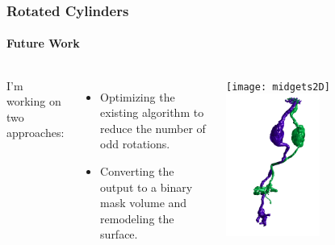 \documentclass[11pt]{beamer}
\begin{document}
\begin{frame}
	\frametitle{Rotated Cylinders}
	\framesubtitle{Future Work}
	\begin{columns}
			I'm working on two approaches:
			\begin{itemize}
				\item Optimizing the existing algorithm to reduce the number of odd rotations.
				\item Converting the output to a binary mask volume and remodeling the surface.
			\end{itemize}
			\texttt{[image: midgets2D]}
			\includegraphics[width=0.5\textwidth]{midgets3D}
	\end{columns}
\end{frame}
\end{document}
